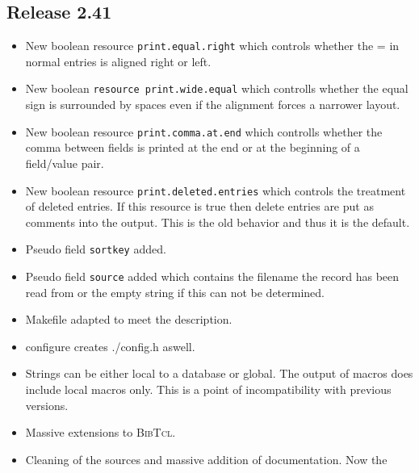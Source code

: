 \documentclass[11pt,a4paper]{scrartcl}
\newcommand\rsc[1]{\texttt{#1}}
\newcommand\File[1]{\textsf{#1}}
\newcommand\BibTcl{\textsc{BibTcl}}
\newenvironment{Release}[2]{%
  \def\tmp{#2}%
  \section*{Release #1 \ifx\tmp\empty\else{\normalsize[#2]}\fi}
  \begin{itemize}
}{\end{itemize}}
\newenvironment{Fix}[1]{\item }{}
\newenvironment{New}[1]{\item }{}
\newenvironment{Doc}[1]{\item }{}
\begin{document}
\begin{multicols}
 \begin{Release}{2.41}{}
  \begin{New}{gene}
    New boolean resource \rsc{print.equal.right} which controls whether
    the = in normal entries is aligned right or left.
  \end{New}
  \begin{New}{gene}
    New boolean \rsc{resource print.wide.equal} which controlls whether
    the equal sign is surrounded by spaces even if the alignment forces a
    narrower layout.
  \end{New}
  \begin{New}{gene}
    New boolean resource \rsc{print.comma.at.end} which controlls
    whether the comma between fields is printed at the end or at the beginning
    of a field/value pair.
  \end{New}
  \begin{New}{gene}
    New boolean resource \rsc{print.deleted.entries} which controls the
    treatment of deleted entries. If this resource is true then delete entries
    are put as comments into the output. This is the old behavior and thus it
    is the default.
  \end{New}
  \begin{New}{gene}
    Pseudo field \rsc{sortkey} added.
  \end{New}
  \begin{New}{gene}
    Pseudo field \rsc{source} added which contains the filename the
    record has been read from or the empty string if this can not be
    determined.
  \end{New}
  \begin{Fix}{gene}
    Makefile adapted to meet the description.
  \end{Fix}
  \begin{New}{gene}
	configure creates \File{./config.h} aswell.
  \end{New}
  \begin{New}{gene}
    Strings can be either local to a database or global. The output of macros
    does include local macros only. This is a point of incompatibility with
    previous versions.
  \end{New}
  \begin{New}{gene}
    Massive extensions to \BibTcl.
  \end{New}
  \begin{Doc}{gene}
    Cleaning of the sources and massive addition of documentation. Now the

\end{Doc}
\end{Release}
\end{multicols}
\end{document}
